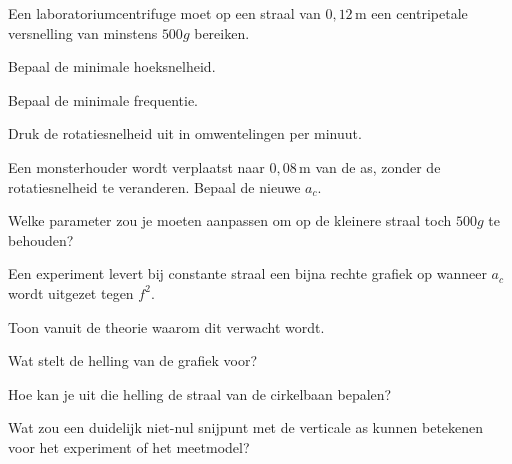 \documentclass{ximera}
\begin{document}
\begin{oefening}{\oefG}

Een laboratoriumcentrifuge moet op een straal van
$0,12\,\mathrm{m}$ een centripetale versnelling van minstens
$500g$ bereiken.

\begin{question}
Bepaal de minimale hoeksnelheid.
\end{question}

\begin{question}
Bepaal de minimale frequentie.
\end{question}

\begin{question}
Druk de rotatiesnelheid uit in omwentelingen per minuut.
\end{question}

\begin{question}
Een monsterhouder wordt verplaatst naar $0,08\,\mathrm{m}$ van de as,
zonder de rotatiesnelheid te veranderen. Bepaal de nieuwe $a_c$.
\end{question}

\begin{question}
Welke parameter zou je moeten aanpassen om op de kleinere straal toch
$500g$ te behouden?
\end{question}

\end{oefening}


\begin{oefening}{\oefG}

Een experiment levert bij constante straal een bijna rechte grafiek op
wanneer $a_c$ wordt uitgezet tegen $f^2$.

\begin{question}
Toon vanuit de theorie waarom dit verwacht wordt.
\end{question}

\begin{question}
Wat stelt de helling van de grafiek voor?
\end{question}

\begin{question}
Hoe kan je uit die helling de straal van de cirkelbaan bepalen?
\end{question}

\begin{question}
Wat zou een duidelijk niet-nul snijpunt met de verticale as kunnen
betekenen voor het experiment of het meetmodel?
\end{question}

\end{oefening}
\end{document}
